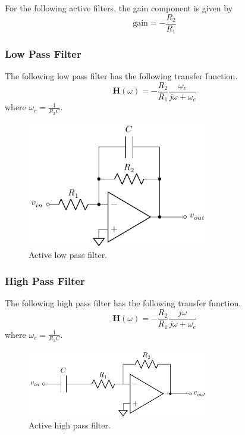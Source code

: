 \documentclass{article}
\begin{document}
For the following active filters, the gain component is given by
\begin{equation*}
    \mathrm{gain} = -\frac{R_2}{R_1}
\end{equation*}
\subsubsection{Low Pass Filter}
The following low pass filter has the following transfer function.
\begin{equation*}
    \symbf{H}(\omega) = -\frac{R_2}{R_1}\frac{\omega_c}{j\omega + \omega_c}
\end{equation*}
where \(\displaystyle \omega_c = \frac{1}{R_2C}\).
\begin{figure}[H]
    \centering
    \includegraphics[width = 8cm, keepaspectratio = true]{figures/active_low_pass_filter.pdf}
    \caption{Active low pass filter.}
\end{figure}
\subsubsection{High Pass Filter}
The following high pass filter has the following transfer function.
\begin{equation*}
    \symbf{H}(\omega) = -\frac{R_2}{R_1}\frac{j\omega}{j\omega + \omega_c}
\end{equation*}
where \(\displaystyle \omega_c = \frac{1}{R_1C}\).
\begin{figure}[H]
    \centering
    \includegraphics[width = 8cm, keepaspectratio = true]{figures/active_high_pass_filter.pdf}
    \caption{Active high pass filter.}
\end{figure}
\end{document}
